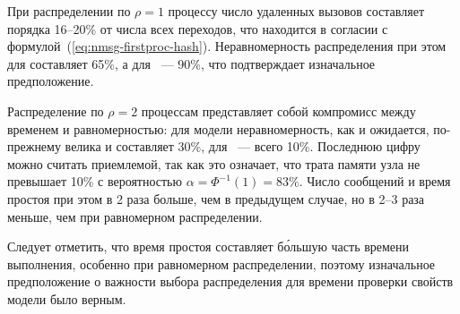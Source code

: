 При распределении по $\rho = 1$ процессу число удаленных вызовов составляет порядка
16--20\% от числа всех переходов, что находится в согласии с
формулой~(\ref{eq:nmsg-firstproc-hash}). Неравномерность распределения при этом для
 составляет 65\%, а для ~--- 90\%, что подтверждает изначальное
предположение.

Распределение по $\rho = 2$ процессам представляет собой компромисс между временем и
равномерностью: для модели  неравномерность, как и ожидается, по-прежнему
велика и составляет 30\%, для ~--- всего 10\%. Последнюю цифру можно
считать приемлемой, так как это означает, что трата памяти узла не превышает 10\% с
вероятностью $\alpha = \Phi^{-1}(1) = 83\%$. Число сообщений и время простоя при этом в 2
раза больше, чем в предыдущем случае, но в 2--3 раза меньше, чем при равномерном
распределении.

Следует отметить, что время простоя составляет б\'{о}льшую часть времени выполнения,
особенно при равномерном распределении, поэтому изначальное предположение о важности
выбора распределения для времени проверки свойств модели было верным.


